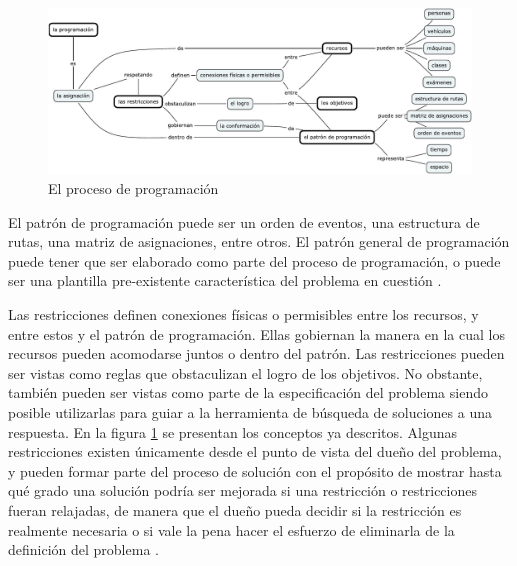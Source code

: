 \documentclass[draft,12pt,headsepline,footsepline,paper=letter]{scrreprt}
\begin{document}
\begin{figure}[hbtp]
\centering
\includegraphics[width=\textwidth]{media/scheduling_process.pdf}
\caption[El proceso de programación]{El proceso de programación}
\label{fig:scheduling_process}
\end{figure}

El patrón de programación puede ser un orden de eventos, una estructura de rutas, una matriz de asignaciones, entre otros. El patrón general de programación puede tener que ser elaborado como parte del proceso de programación, o puede ser una plantilla pre-existente característica del problema en cuestión \citep[p.~48]{wren95scheduling-timetabling}.

Las restricciones definen conexiones físicas o permisibles entre los recursos, y entre estos y el patrón de programación. Ellas gobiernan la manera en la cual los recursos pueden acomodarse juntos o dentro del patrón. Las restricciones pueden ser vistas como reglas que obstaculizan el logro de los objetivos. No obstante, también pueden ser vistas como parte de la especificación del problema siendo posible utilizarlas para guiar a la herramienta de búsqueda de soluciones a una respuesta.
%
En la figura \ref{fig:scheduling_process} se presentan los conceptos ya descritos.
%
Algunas restricciones existen únicamente desde el punto de vista del dueño del problema, y pueden formar parte del proceso de solución con el propósito de mostrar hasta qué grado una solución podría ser mejorada si una restricción o restricciones fueran relajadas, de manera que el dueño pueda decidir si la restricción es realmente necesaria o si vale la pena hacer el esfuerzo de eliminarla de la definición del problema \citep[p.~48]{wren95scheduling-timetabling}.
\end{document}
